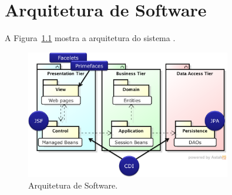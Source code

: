 
\chapter{Arquitetura de Software}
\label{sec-arquitetura}
\vspace{-1cm}

A Figura~\ref{figura-arquitetura} mostra a arquitetura do sistema \emph{\imprimirtitulo}.

\begin{figure}[h]
	\centering
	\includegraphics[width=0.8\textwidth]{figuras/figura-arquitetura-padrao.png}
	\caption{Arquitetura de Software.}
	\label{figura-arquitetura}
\end{figure}

